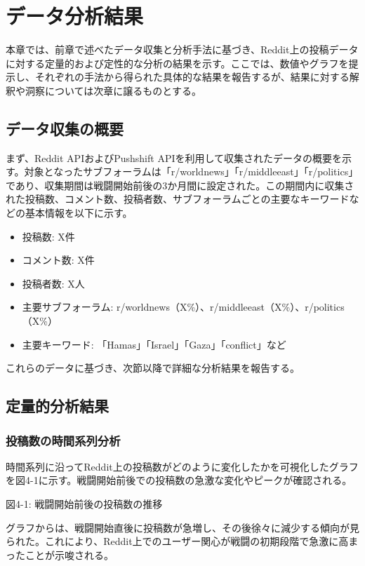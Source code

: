 \documentclass[11pt, a4j]{jreport}
\begin{document}
    \chapter{データ分析結果}
    本章では、前章で述べたデータ収集と分析手法に基づき、Reddit上の投稿データに対する定量的および定性的な分析の結果を示す。ここでは、数値やグラフを提示し、それぞれの手法から得られた具体的な結果を報告するが、結果に対する解釈や洞察については次章に譲るものとする。

    \section{データ収集の概要}
    まず、Reddit APIおよびPushshift APIを利用して収集されたデータの概要を示す。対象となったサブフォーラムは「r/worldnews」「r/middleeast」「r/politics」であり、収集期間は戦闘開始前後の3か月間に設定された。この期間内に収集された投稿数、コメント数、投稿者数、サブフォーラムごとの主要なキーワードなどの基本情報を以下に示す。

    \begin{itemize}
        \item 投稿数: X件

        \item コメント数: X件

        \item 投稿者数: X人

        \item 主要サブフォーラム: r/worldnews（X\%）、r/middleeast（X\%）、r/politics（X\%）

        \item 主要キーワード: 「Hamas」「Israel」「Gaza」「conflict」など
    \end{itemize}

    これらのデータに基づき、次節以降で詳細な分析結果を報告する。

    \section{定量的分析結果}
    \subsection{投稿数の時間系列分析}
    時間系列に沿ってReddit上の投稿数がどのように変化したかを可視化したグラフを図4-1に示す。戦闘開始前後での投稿数の急激な変化やピークが確認される。

    図4-1: 戦闘開始前後の投稿数の推移

    グラフからは、戦闘開始直後に投稿数が急増し、その後徐々に減少する傾向が見られた。これにより、Reddit上でのユーザー関心が戦闘の初期段階で急激に高まったことが示唆される。
\end{document}
